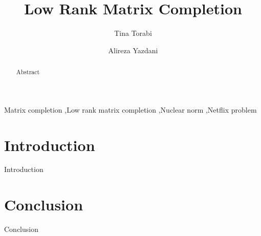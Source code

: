\documentclass[3p, twocolumn, number, sort&compress, times]{elsarticle}
\begin{document}
\begin{frontmatter}

	\title{Low Rank Matrix Completion}
	\author[1]{Tina Torabi}
	\author[2]{Alireza Yazdani}

	\begin{abstract}
		Abstract
	\end{abstract}

	\begin{keyword}
		Matrix completion \sep Low rank matrix completion \sep Nuclear norm \sep Netflix problem
	\end{keyword}

\end{frontmatter}
\section{Introduction} \label{sec:intro}

Introduction

\section{Conclusion} \label{ sec:conclusion }

Conclusion



\end{document}
